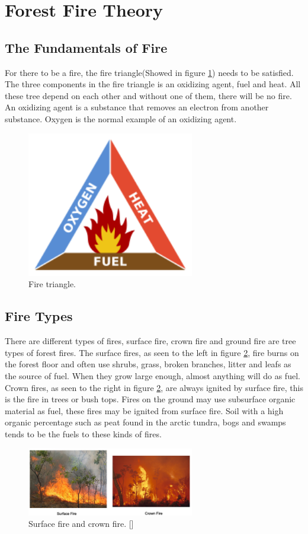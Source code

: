 \section{Forest Fire Theory}
\subsection{The Fundamentals of Fire}
For there to be a fire, the fire triangle(Showed in figure \ref{fig:fire-triangle}) needs to be satisfied. The three components in the fire triangle is an oxidizing agent, fuel and heat. All these tree depend on each other and without one of them, there will be no fire. An oxidizing agent is a substance that removes an electron from another substance. Oxygen is the normal example of an oxidizing agent.
\begin{figure}[here]
  \centering
      \includegraphics[width=0.65\textwidth]{theory/graphics/fire-triangle.png}
  \caption{ Fire triangle.\cite{fire-tirangleimage} }
  \label{fig:fire-triangle}
\end{figure}
\subsection{Fire Types}
There are different types of fires, surface fire, crown fire and ground fire are tree types of forest fires. The surface fires, as seen to the left in figure \ref{fig:fire-types}, fire burns on the forest floor and often use shrubs, grass, broken branches, litter and leafs as the source of fuel. When they grow large enough, almost anything will do as fuel. Crown fires, as seen to the right in figure \ref{fig:fire-types}, are always ignited by surface fire, this is the fire in trees or bush tops. Fires on the ground may use subsurface organic material as fuel, these fires may be ignited from surface fire. Soil with a high organic percentage such as peat found in the arctic tundra, bogs and swamps tends to be the fuels to these kinds of fires.
\begin{figure}[here]
  \centering
      \includegraphics[width=0.65\textwidth]{theory/graphics/fire-types.png}
  \caption{Surface fire and crown fire. [] }
  \label{fig:fire-types}
\end{figure}
